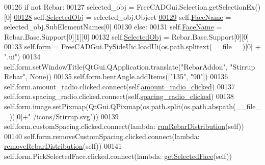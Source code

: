 \begin{DoxyCode}
00126         \textcolor{keywordflow}{if} \textcolor{keywordflow}{not} Rebar:
00127             selected\_obj = FreeCADGui.Selection.getSelectionEx()[0]
\hypertarget{Stirrup_8py_source.tex_l00128}{}\hyperlink{classStirrup_1_1__StirrupTaskPanel_a25d8b984bd2817ec46c1375b6bec647d}{00128}             self.\hyperlink{classStirrup_1_1__StirrupTaskPanel_a25d8b984bd2817ec46c1375b6bec647d}{SelectedObj} = selected\_obj.Object
\hypertarget{Stirrup_8py_source.tex_l00129}{}\hyperlink{classStirrup_1_1__StirrupTaskPanel_a8c01c4e8108c6aaad15394072b188730}{00129}             self.\hyperlink{classStirrup_1_1__StirrupTaskPanel_a8c01c4e8108c6aaad15394072b188730}{FaceName} = selected\_obj.SubElementNames[0]
00130         \textcolor{keywordflow}{else}:
00131             self.\hyperlink{classStirrup_1_1__StirrupTaskPanel_a8c01c4e8108c6aaad15394072b188730}{FaceName} = Rebar.Base.Support[0][1][0]
00132             self.\hyperlink{classStirrup_1_1__StirrupTaskPanel_a25d8b984bd2817ec46c1375b6bec647d}{SelectedObj} = Rebar.Base.Support[0][0]
\hypertarget{Stirrup_8py_source.tex_l00133}{}\hyperlink{classStirrup_1_1__StirrupTaskPanel_a5a1680bdb656504a7151fb346b578cd6}{00133}         self.\hyperlink{classStirrup_1_1__StirrupTaskPanel_a5a1680bdb656504a7151fb346b578cd6}{form} = FreeCADGui.PySideUic.loadUi(os.path.splitext(\_\_file\_\_)[0] + \textcolor{stringliteral}{".ui"})
00134         self.form.setWindowTitle(QtGui.QApplication.translate(\textcolor{stringliteral}{"RebarAddon"}, \textcolor{stringliteral}{"Stirrup Rebar"}, \textcolor{keywordtype}{None}))
00135         self.form.bentAngle.addItems([\textcolor{stringliteral}{"135"}, \textcolor{stringliteral}{"90"}])
00136         self.form.amount\_radio.clicked.connect(self.\hyperlink{classStirrup_1_1__StirrupTaskPanel_acf38bd6966c793e88ebc0d5d01db3148}{amount\_radio\_clicked})
00137         self.form.spacing\_radio.clicked.connect(self.\hyperlink{classStirrup_1_1__StirrupTaskPanel_ac091360b77eb8b65a0f520af0d2c4584}{spacing\_radio\_clicked})
00138         self.form.image.setPixmap(QtGui.QPixmap(os.path.split(os.path.abspath(\_\_file\_\_))[0]+\textcolor{stringliteral}{"
      /icons/Stirrup.svg"}))
00139         self.form.customSpacing.clicked.connect(\textcolor{keyword}{lambda}: \hyperlink{namespaceRebarDistribution_aa547df5cb10d2e64eaa0b51c445fa30b}{runRebarDistribution}(self))
00140         self.form.removeCustomSpacing.clicked.connect(\textcolor{keyword}{lambda}: 
      \hyperlink{namespaceRebarDistribution_a85270a1b6e8c782a9e0ba54add518f2a}{removeRebarDistribution}(self))
00141         self.form.PickSelectedFace.clicked.connect(\textcolor{keyword}{lambda}: \hyperlink{namespaceRebarfunc_a8c003df49ac5f249bd9ea4acfb7d2f8d}{getSelectedFace}(self))

\end{DoxyCode}
